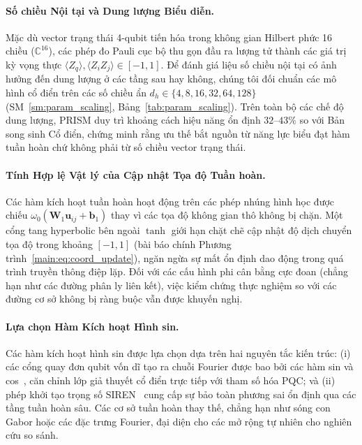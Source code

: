 \documentclass[10pt,twocolumn,letterpaper]{article}
\begin{document}
\paragraph{Số chiều Nội tại và Dung lượng Biểu diễn.}
Mặc dù vector trạng thái 4-qubit tiến hóa trong không gian Hilbert phức 16 chiều ($\mathbb{C}^{16}$), các phép đo Pauli cục bộ thu gọn đầu ra lượng tử thành các giá trị kỳ vọng thực $\langle Z_q \rangle, \langle Z_i Z_j \rangle \in [-1, 1]$. Để đánh giá liệu số chiều nội tại có ảnh hưởng đến dung lượng ở các tầng sau hay không, chúng tôi đối chuẩn các mô hình cổ điển trên các số chiều ẩn $d_h \in \{4, 8, 16, 32, 64, 128\}$ (SM~\ref{sm:param_scaling}, Bảng~\ref{tab:param_scaling}). Trên toàn bộ các chế độ dung lượng, PRISM duy trì khoảng cách hiệu năng ổn định $32\text{--}43\%$ so với Bản song sinh Cổ điển, chứng minh rằng ưu thế bắt nguồn từ năng lực biểu đạt hàm tuần hoàn chứ không phải từ số chiều vector trạng thái.

\paragraph{Tính Hợp lệ Vật lý của Cập nhật Tọa độ Tuần hoàn.}
Các hàm kích hoạt tuần hoàn hoạt động trên các phép nhúng hình học được chiếu $\omega_0(\mathbf{W}_1 \mathbf{u}_{ij} + \mathbf{b}_1)$ thay vì các tọa độ không gian thô không bị chặn. Một cổng tang hyperbolic bên ngoài $\tanh$ giới hạn chặt chẽ cập nhật độ dịch chuyển tọa độ trong khoảng $[-1, 1]$ (bài báo chính Phương trình~\ref{main:eq:coord_update}), ngăn ngừa sự mất ổn định dao động trong quá trình truyền thông điệp lặp. Đối với các cấu hình phi cân bằng cực đoan (chẳng hạn như các đường phân ly liên kết), việc kiểm chứng thực nghiệm so với các đường cơ sở không bị ràng buộc vẫn được khuyến nghị.

\paragraph{Lựa chọn Hàm Kích hoạt Hình sin.}
Các hàm kích hoạt hình sin được lựa chọn dựa trên hai nguyên tắc kiến trúc: (i) các cổng quay đơn qubit vốn dĩ tạo ra chuỗi Fourier được bao bởi các hàm sin và cos~\cite{Schuld:2020enb}, căn chỉnh lớp giả thuyết cổ điển trực tiếp với tham số hóa PQC; và (ii) phép khởi tạo trọng số SIREN~\cite{sitzmann2020siren} cung cấp sự bảo toàn phương sai ổn định qua các tầng tuần hoàn sâu. Các cơ sở tuần hoàn thay thế, chẳng hạn như sóng con Gabor hoặc các đặc trưng Fourier, đại diện cho các mở rộng tự nhiên cho nghiên cứu so sánh.
\end{document}
